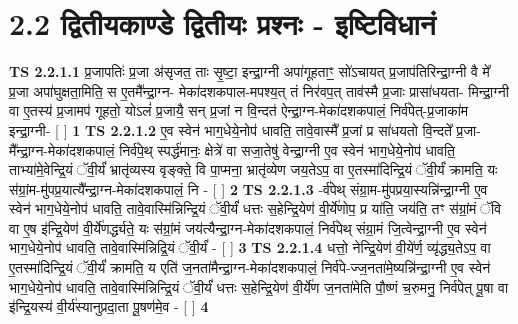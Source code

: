 \documentclass[17pt]{extarticle}
\begin{document}
     \section*{ 2.2     द्वितीयकाण्डे द्वितीयः प्रश्नः - इष्टिविधानं }
                                        \textbf{ TS 2.2.1.1} \newline
                  प्र॒जापतिः॑ प्र॒जा अ॑सृजत॒ ताः सृ॒ष्टा॒ इन्द्रा॒ग्नी अपा॑गूहताꣳ॒॒ सो॑ऽचायत् प्र॒जाप॑तिरिन्द्रा॒ग्नी वै मे᳚ प्र॒जा अपा॑घुक्षता॒मिति॒ स ए॒तमै᳚न्द्रा॒ग्न- मेका॑दशकपाल-मपश्य॒त् तं निर॑वप॒त् ताव॑स्मै प्र॒जाः प्रासा॑धयता- मिन्द्रा॒ग्नी वा ए॒तस्य॑ प्र॒जामप॑ गूहतो॒ योऽलं॑ प्र॒जायै॒ सन् प्र॒जां न वि॒न्दत॑ ऐन्द्रा॒ग्न-मेका॑दशकपालं॒ निर्व॑पेत्-प्र॒जाका॑म इन्द्रा॒ग्नी-  [  ] \textbf{  1} \newline
                  \newline
                                \textbf{ TS 2.2.1.2} \newline
                  ए॒व स्वेन॑ भाग॒धेये॒नोप॑ धावति॒ तावे॒वास्मै᳚ प्र॒जां प्र सा॑धयतो वि॒न्दते᳚ प्र॒जा-मै᳚न्द्रा॒ग्न-मेका॑दशकपालं॒ निर्व॑पे॒थ् स्पर्द्ध॑मानः॒ क्षेत्रे॑ वा सजा॒तेषु॑ वेन्द्रा॒ग्नी ए॒व स्वेन॑ भाग॒धेये॒नोप॑ धावति॒ ताभ्या॑मे॒वेन्द्रि॒यं ॅवी॒र्यं॑ भ्रातृ॑व्यस्य वृङ्क्ते॒ वि पा॒प्मना॒ भ्रातृ॑व्येण जय॒तेऽप॒ वा ए॒तस्मा॑दिन्द्रि॒यं ॅवी॒र्यं॑ क्रामति॒ यः स॑ग्रां॒म-मु॑पप्र॒यात्यै᳚न्द्रा॒ग्न-मेका॑दशकपालं॒ नि - [  ] \textbf{  2} \newline
                  \newline
                                \textbf{ TS 2.2.1.3} \newline
                  -र्व॑पेथ् संग्रा॒म-मु॑पप्रया॒स्यन्नि॑न्द्रा॒ग्नी ए॒व स्वेन॑ भाग॒धेये॒नोप॑ धावति॒ तावे॒वास्मि॑न्निन्द्रि॒यं ॅवी॒र्यं॑ धत्तः स॒हेन्द्रि॒येण॑ वी॒र्ये॑णोप॒ प्र या॑ति॒ जय॑ति॒ तꣳ स॑ग्रां॒मं ॅवि वा ए॒ष इ॑न्द्रि॒येण॑ वी॒र्ये॑णर्द्ध्यते॒ यः स॑ग्रां॒मं जय॑त्यैन्द्रा॒ग्न-मेका॑दशकपालं॒ निर्व॑पेथ् संग्रा॒मं जि॒त्वेन्द्रा॒ग्नी ए॒व स्वेन॑ भाग॒धेये॒नोप॑ धावति॒ तावे॒वास्मि॑न्निद्रि॒यं ॅवी॒र्यं॑ - [  ] \textbf{  3} \newline
                  \newline
                                \textbf{ TS 2.2.1.4} \newline
                  धत्तो॒ नेन्द्रि॒येण॑ वी॒ये॑र्ण॒ व्यृ॑द्ध्य॒तेऽप॒ वा ए॒तस्मा॑दिन्द्रि॒यं ॅवी॒र्यं॑ क्रामति॒ य एति॑ ज॒नता॑मैन्द्रा॒ग्न-मेका॑दशकपालं॒ निर्व॑पे-ज्ज॒नता॑मे॒ष्यन्नि॑न्द्रा॒ग्नी ए॒व स्वेन॑ भाग॒धेये॒नोप॑ धावति॒ तावे॒वास्मि॑न्निन्द्रि॒यं ॅवी॒र्यं॑ धत्तः स॒हेन्द्रि॒येण॑ वी॒र्ये॑ण ज॒नता॑मेति पौ॒ष्णं च॒रुमनु॒ निर्व॑पेत् पू॒षा वा इ॑न्द्रि॒यस्य॑ वी॒र्य॑स्यानुप्रदा॒ता पू॒षण॑मे॒व - [  ] \textbf{  4} \newline
\end{document}
